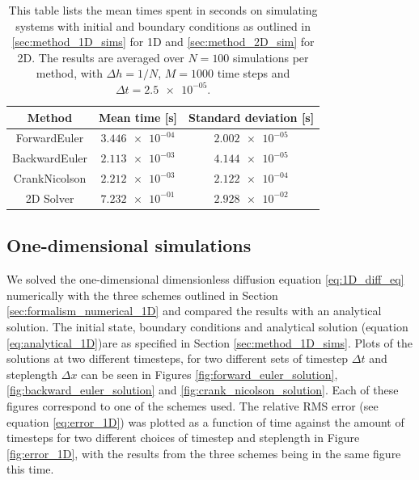 \documentclass[reprint,english,notitlepage]{revtex4-1}  %
\begin{document}
\begin{table}[H]
\centering
\caption{This table lists the mean times spent in seconds on simulating systems with initial and boundary conditions as outlined in \ref{sec:method_1D_sims} for 1D and \ref{sec:method_2D_sim} for 2D. The results are averaged over \(N = 100\) simulations per method, with \(\Delta h = 1/N\), \(M = 1000\) time steps and \(\Delta t = \num{2.5e-05}\).} \label{table:benchmark}
\begin{tabular}{|c|c|c|}
\hline
Method & Mean time [s] & Standard deviation [s]\\\hline
ForwardEuler & \(\num{3.446e-04}\) & \(\num{2.002e-05}\) \\
BackwardEuler & \(\num{2.113e-03}\) & \(\num{4.144e-05}\) \\
CrankNicolson & \(\num{2.212e-03}\) & \(\num{2.122e-04}\) \\
2D Solver & \(\num{7.232e-01}\) & \(\num{2.928e-02}\) \\\hline
\end{tabular}
\end{table}

\subsection{One-dimensional simulations} \label{sec:results_1D}

We solved the one-dimensional dimensionless diffusion equation \eqref{eq:1D_diff_eq} numerically with the three schemes outlined in Section \ref{sec:formalism_numerical_1D} and compared the results with an analytical solution. The initial state, boundary conditions and analytical solution (equation \eqref{eq:analytical_1D})are as specified in Section \ref{sec:method_1D_sims}. Plots of the solutions at two different timesteps, for two different sets of timestep $\Delta t$ and steplength $\Delta x$ can be seen in Figures \ref{fig:forward_euler_solution}, \ref{fig:backward_euler_solution} and \ref{fig:crank_nicolson_solution}. Each of these figures correspond to one of the schemes used. The relative RMS error (see equation \eqref{eq:error_1D}) was plotted as a function of time against the amount of timesteps for two different choices of timestep and steplength in Figure \ref{fig:error_1D}, with the results from the three schemes being in the same figure this time. 
\end{document}
